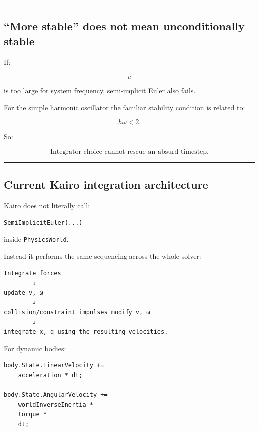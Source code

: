 \begin{center}\rule{0.5\linewidth}{0.5pt}\end{center}

\subsection{``More stable'' does not mean unconditionally stable}\label{06-engine-ii-ch037-more-stable-does-not-mean-unconditionally-stable}

\hypertarget{06-engine-ii-ch037-more-stable-does-not-mean-unconditionally-stable}{}

If:

\[
h
\]

is too large for system frequency, semi-implicit Euler also fails.

For the simple harmonic oscillator the familiar stability condition is related to:

\[
h\omega<2.
\]

So:

\[
\boxed{
\text{Integrator choice cannot rescue an absurd timestep.}
}
\]

\begin{center}\rule{0.5\linewidth}{0.5pt}\end{center}

\subsection{Current Kairo integration architecture}\label{06-engine-ii-ch037-current-kairo-integration-architecture}

\hypertarget{06-engine-ii-ch037-current-kairo-integration-architecture}{}

Kairo does not literally call:

\begin{verbatim}
SemiImplicitEuler(...)
\end{verbatim}

inside \texttt{PhysicsWorld}.

Instead it performs the same sequencing across the whole solver:

\begin{verbatim}
Integrate forces
        ↓
update v, ω
        ↓
collision/constraint impulses modify v, ω
        ↓
integrate x, q using the resulting velocities.
\end{verbatim}

For dynamic bodies:

\begin{verbatim}
body.State.LinearVelocity +=
    acceleration * dt;

body.State.AngularVelocity +=
    worldInverseInertia *
    torque *
    dt;
\end{verbatim}

